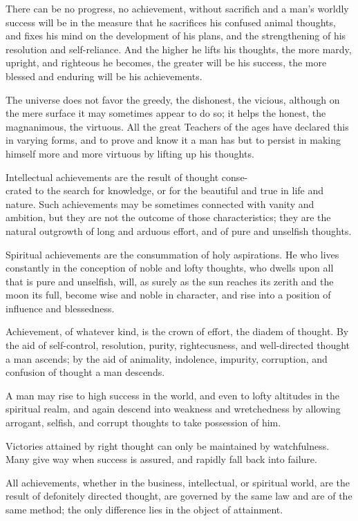 \documentclass[10pt]{article}
\begin{document}
There can be no progress, no achievement, without sacrifich and a man's worldly success will be in the measure that he sacrifices his confused animal thoughts, and fixes his mind on the development of his plans, and the strengthening of his resolution and self-reliance. And the higher he lifts his thoughts, the more mardy, upright, and righteous he becomes, the greater will be his success, the more blessed and enduring will be his achievements.

The universe does not favor the greedy, the dishonest, the vicious, although on the mere surface it may sometimes appear to do so; it helps the honest, the magnanimous, the virtuous. All the great Teachers of the ages have declared this in varying forms, and to prove and know it a man has but to persist in making himself more and more virtuous by lifting up his thoughts.

Intellectual achievements are the result of thought conse-\\
crated to the search for knowledge, or for the beautiful and true in life and nature. Such achievements may be sometimes connected with vanity and ambition, but they are not the outcome of those characteristics; they are the natural outgrowth of long and arduous effort, and of pure and unselfish thoughts.

Spiritual achievements are the consummation of holy aspirations. He who lives constantly in the conception of noble and lofty thoughts, who dwells upon all that is pure and unselfish, will, as surely as the sun reaches its zerith and the moon its full, become wise and noble in character, and rise into a position of influence and blessedness.

Achievement, of whatever kind, is the crown of effort, the diadem of thought. By the aid of self-control, resolution, purity, rightecusness, and well-directed thought a man ascends; by the aid of animality, indolence, impurity, corruption, and confusion of thought a man descends.

A man may rise to high success in the world, and even to lofty altitudes in the spiritual realm, and again descend into weakness and wretchedness by allowing arrogant, selfish, and corrupt thoughts to take possession of him.

Victories attained by right thought can only be maintained by watchfulness. Many give way when success is assured, and rapidly fall back into failure.

All achievements, whether in the business, intellectual, or spiritual world, are the result of defonitely directed thought, are governed by the same law and are of the same method; the only difference lies in the object of attainment.
\end{document}

